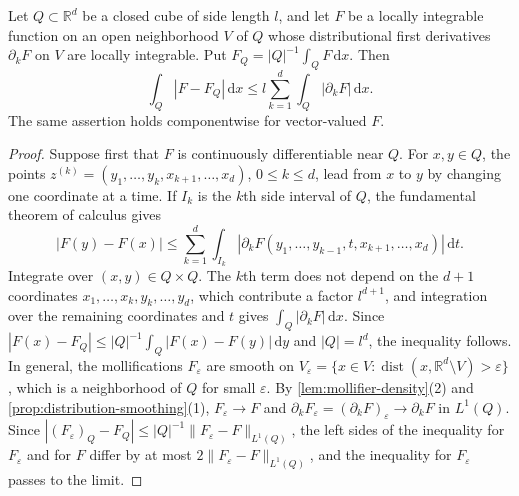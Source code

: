 \begin{lemma}\label{lem:weak-poincare-cube}
Let $Q\subset\mathbb R^d$ be a closed cube of side length $l$, and let $F$ be a locally integrable function on an open neighborhood $V$ of $Q$ whose distributional first derivatives $\partial_kF$ on $V$ are locally integrable. Put $F_Q=|Q|^{-1}\int_QF\,\mathrm dx$. Then
\[
 \int_Q|F-F_Q|\,\mathrm dx\le l\sum_{k=1}^d\int_Q|\partial_kF|\,\mathrm dx.
\]
The same assertion holds componentwise for vector-valued $F$.
\end{lemma}
\begin{proof}
Suppose first that $F$ is continuously differentiable near $Q$. For $x,y\in Q$, the points $z^{(k)}=(y_1,\ldots,y_k,x_{k+1},\ldots,x_d)$, $0\leq k\leq d$, lead from $x$ to $y$ by changing one coordinate at a time. If $I_k$ is the $k$th side interval of $Q$, the fundamental theorem of calculus gives
\[
 |F(y)-F(x)|\leq\sum_{k=1}^d\int_{I_k}|\partial_kF(y_1,\ldots,y_{k-1},t,x_{k+1},\ldots,x_d)|\,\mathrm dt.
\]
Integrate over $(x,y)\in Q\times Q$. The $k$th term does not depend on the $d+1$ coordinates $x_1,\ldots,x_k,y_k,\ldots,y_d$, which contribute a factor $l^{d+1}$, and integration over the remaining coordinates and $t$ gives $\int_Q|\partial_kF|\,\mathrm dx$. Since $|F(x)-F_Q|\leq|Q|^{-1}\int_Q|F(x)-F(y)|\,\mathrm dy$ and $|Q|=l^d$, the inequality follows. In general, the mollifications $F_\varepsilon$ are smooth on $V_\varepsilon=\{x\in V:\operatorname{dist}(x,\mathbb R^d\setminus V)>\varepsilon\}$, which is a neighborhood of $Q$ for small $\varepsilon$. By \cref{lem:mollifier-density}(2) and \cref{prop:distribution-smoothing}(1), $F_\varepsilon\to F$ and $\partial_kF_\varepsilon=(\partial_kF)_\varepsilon\to\partial_kF$ in $L^1(Q)$. Since $|(F_\varepsilon)_Q-F_Q|\leq|Q|^{-1}\|F_\varepsilon-F\|_{L^1(Q)}$, the left sides of the inequality for $F_\varepsilon$ and for $F$ differ by at most $2\|F_\varepsilon-F\|_{L^1(Q)}$, and the inequality for $F_\varepsilon$ passes to the limit.
\end{proof}

